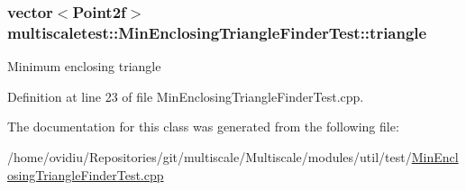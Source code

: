 \hypertarget{classmultiscaletest_1_1MinEnclosingTriangleFinderTest_a02aa9bcd10630d27293e656233e3f64e}{
\subsubsection[{triangle}]{\setlength{\rightskip}{0pt plus 5cm}vector$<$\-Point2f$>$ {\bf multiscaletest\-::\-Min\-Enclosing\-Triangle\-Finder\-Test\-::triangle}}}\label{classmultiscaletest_1_1MinEnclosingTriangleFinderTest_a02aa9bcd10630d27293e656233e3f64e}
\-Minimum enclosing triangle 

\-Definition at line 23 of file \-Min\-Enclosing\-Triangle\-Finder\-Test.\-cpp.



\-The documentation for this class was generated from the following file\-:\begin{DoxyCompactItemize}
\item 
/home/ovidiu/\-Repositories/git/multiscale/\-Multiscale/modules/util/test/\hyperlink{MinEnclosingTriangleFinderTest_8cpp}{\-Min\-Enclosing\-Triangle\-Finder\-Test.\-cpp}\end{DoxyCompactItemize}
